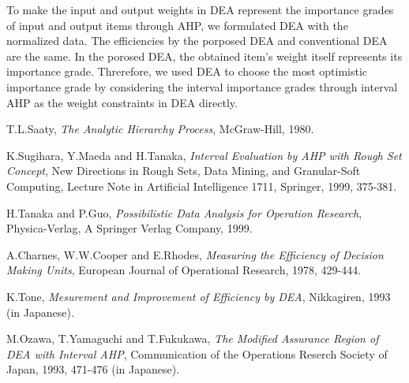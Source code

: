 To make the input and output weights in DEA represent the importance grades of input and output items through AHP, we formulated DEA with the normalized data. 
The efficiencies by the porposed DEA and conventional DEA are the same. 
In the porosed DEA, the obtained item's weight itself represents its importance grade. 
Threrefore, we used DEA to choose the most optimistic importance grade by considering the interval importance grades through interval AHP as the weight constraints in DEA directly. 

\begin{thebibliography}{6}
 T.L.Saaty,
{\it The Analytic Hierarchy Process},
McGraw-Hill, 1980. 

 K.Sugihara, Y.Maeda and H.Tanaka,
{\it Interval Evaluation by AHP with Rough Set Concept},
New Directions in Rough Sets, Data Mining, and Granular-Soft Computing, Lecture Note in Artificial Intelligence 1711, Springer, 1999, 375-381. 

 H.Tanaka and P.Guo,
{\it Possibilistic Data Analysis for  Operation Research},
Physica-Verlag, A Springer Verlag Company, 1999. 

 A.Charnes, W.W.Cooper and E.Rhodes,
{\it Measuring the Efficiency of Decision Making Units},
European Journal of Operational Research, 1978, 429-444. 

 K.Tone,
{\it Mesurement and Improvement of Efficiency by DEA},
Nikkagiren, 1993 (in Japanese). 

 M.Ozawa, T.Yamaguchi and T.Fukukawa,
{\it The Modified Assurance Region of DEA with Interval AHP},
Communication of the Operations Reserch Society of Japan, 1993, 471-476 (in Japanese). 

\end{thebibliography}



